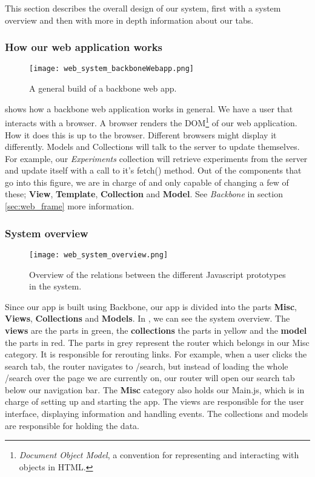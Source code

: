 This section describes the overall design of our system, first with a system overview and then with more in depth information about our tabs.
\subsubsection{How our web application works}
\begin{figure}[h]
\centering
\texttt{[image: web\_system\_backboneWebapp.png]}
\caption{\label{fig:web_system_backboneWebapp}A general build of a backbone web app.}
\end{figure}

 shows how a backbone\cite{web_1} web application works in general. We have a user that interacts with a browser. A browser renders the DOM\footnote{\textit{Document Object Model}, a convention for representing and interacting with objects in HTML.} of our web application. How it does this is up to the browser. Different browsers might display it differently. Models and Collections will talk to the server to update themselves. For example, our \textit{Experiments} collection will retrieve experiments from the server and update itself with a call to it’s fetch() method. Out of the components that go into this figure, we are in charge of and only capable of changing a few of these; \textbf{View}, \textbf{Template}, \textbf{Collection} and \textbf{Model}. See \textit{Backbone} in section \ref{sec:web_frame} more information.

\subsubsection{System overview}
\begin{figure}[h]
\centering
\texttt{[image: web\_system\_overview.png]}
\caption{\label{fig:web_system_overview}Overview of the relations between the different Javascript prototypes in the system.}
\end{figure}

Since our app is built using Backbone\cite{web_1}, our app is divided into the parts \textbf{Misc}, \textbf{Views}, \textbf{Collections} and \textbf{Models}. In , we can see the system overview. The \textbf{views} are the parts in green, the \textbf{collections} the parts in yellow and the \textbf{model} the parts in red. The parts in grey represent the router which belongs in our Misc category. It is responsible for rerouting links. For example, when a user clicks the search tab, the router navigates to /search, but instead of loading the whole /search over the page we are currently on, our router will open our search tab below our navigation bar. The \textbf{Misc} category also holds our Main.js, which is in charge of setting up and starting the app. The views are responsible for the user interface, displaying information and handling events. The collections and models are responsible for holding the data.

